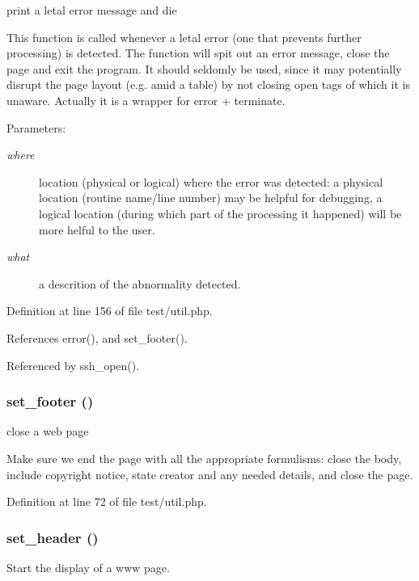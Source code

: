 print a letal error message and die 

This function is called whenever a letal error (one that prevents further processing) is detected. The function will spit out an error message, close the page and exit the program. It should seldomly be used, since it may potentially disrupt the page layout (e.g. amid a table) by not closing open tags of which it is unaware. Actually it is a wrapper for error + terminate.

\begin{Desc}
\item[Parameters:]
\begin{description}
\item[{\em where}]location (physical or logical) where the error was detected: a physical location (routine name/line number) may be helpful for debugging, a logical location (during which part of the processing it happened) will be more helful to the user.\item[{\em what}]a descrition of the abnormality detected. \end{description}
\end{Desc}


Definition at line 156 of file test/util.php.

References error(), and set\_\-footer().

Referenced by ssh\_\-open().
\subsubsection{\setlength{\rightskip}{0pt plus 5cm}set\_\-footer ()}\label{test_2util_8php_a1}


close a web page 

Make sure we end the page with all the appropriate formulisms: close the body, include copyright notice, state creator and any needed details, and close the page. 

Definition at line 72 of file test/util.php.
\subsubsection{\setlength{\rightskip}{0pt plus 5cm}set\_\-header ()}\label{test_2util_8php_a0}


Start the display of a www page. 

